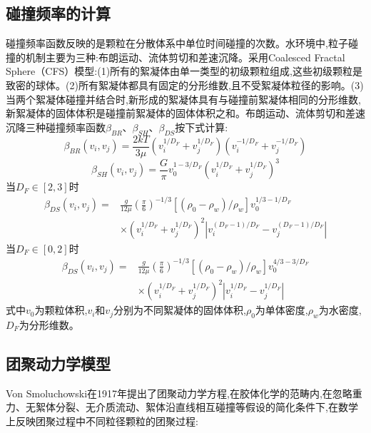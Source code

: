 \subsection{碰撞频率的计算}

碰撞频率函数反映的是颗粒在分散体系中单位时间碰撞的次数。水环境中,粒子碰撞的机制主要为三种:布朗运动、流体剪切和差速沉降\cite{ThomasJudd-749}。采用Coalesced Fractal Sphere（CFS）模型\cite{LeeBonner-748}:(1)所有的絮凝体由单一类型的初级颗粒组成,这些初级颗粒是致密的球体。(2)所有絮凝体都具有固定的分形维数,且不受絮凝体粒径的影响。(3) 当两个絮凝体碰撞并结合时,新形成的絮凝体具有与碰撞前絮凝体相同的分形维数,新絮凝体的固体体积是碰撞前絮凝体的固体体积之和。布朗运动、流体剪切和差速沉降三种碰撞频率函数$\beta_{BR}$、$\beta_{SH}$、$\beta_{DS}$按下式计算\cite{LeeBonner-748}:
\begin{equation}\label{beta_br}
    \beta_{BR}(v_i,v_j)=\frac{2kT}{3\mu}(v_i^{1/D_F}+v_j^{1/D_F})(v_i^{-1/D_F}+v_j^{-1/D_F})
\end{equation}
\begin{equation}\label{beta_sh}
    \beta_{SH}(v_i,v_j)=\frac{G}{\pi}v_0^{1-3/D_F}{(v_i^{1/D_F}+v_j^{1/D_F})}^3
\end{equation}
当$D_F\in[2,3]$时
\begin{align}\label{beta_ds}
    \beta_{DS}(v_i,v_j)=&\frac{g}{12\mu}{(\frac{\pi}{6})}^{-1/3}[(\rho_0-\rho_w)/\rho_w]v_0^{1/3-1/D_F}\\ & \times(v_i^{1/D_F}+v_j^{1/D_F})^2\left|v_i^{(D_F-1)/D_F}-v_j^{(D_F-1)/D_F}\right| \nonumber
\end{align}
当$D_F\in[0,2]$时
\begin{align}
    \beta_{DS}(v_i,v_j)=&\frac{g}{12\mu}{(\frac{\pi}{6})}^{-1/3}[(\rho_0-\rho_w)/\rho_w]v_0^{4/3-3/D_F}\\ &\times(v_i^{1/D_F}+v_j^{1/D_F})^2\left|v_i^{1/D_F}-v_j^{1/D_F}\right| \nonumber
\end{align}
式中$v_0$为颗粒体积,$v_i$和$v_j$分别为不同絮凝体的固体体积,$\rho_0$为单体密度,$\rho_w$为水密度,$D_F$为分形维数。

\subsection{团聚动力学模型}

Von Smoluchowski在1917年提出了团聚动力学方程\cite{Smoluchowski-752},在胶体化学的范畴内,在忽略重力、无絮体分裂、无介质流动、絮体沿直线相互碰撞等假设的简化条件下,在数学上反映团聚过程中不同粒径颗粒的团聚过程\cite{Smoluchowski-752}:

